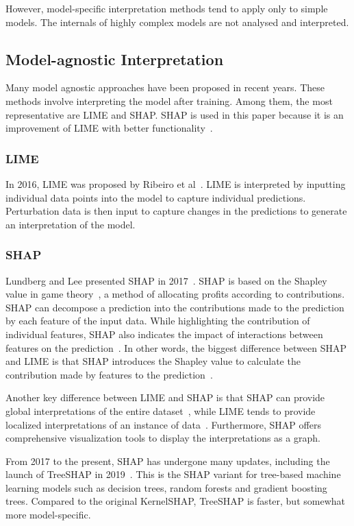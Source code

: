 \documentclass[runningheads,a4paper]{llncs}
\begin{document}
However, model-specific interpretation methods tend to apply only to simple models. The internals of highly complex models are not analysed and interpreted.

\subsection{Model-agnostic Interpretation}
Many model agnostic approaches have been proposed in recent years. 
These methods involve interpreting the model after training.
Among them, the most representative are LIME and SHAP.
SHAP is used in this paper because it is an improvement of LIME with better functionality~\cite{alvarezmelis2018robustness}.
\subsubsection{LIME}
In 2016, LIME was proposed by Ribeiro et al~\cite{ribeiro2016should}.
LIME is interpreted by inputting individual data points into the model to capture individual predictions. Perturbation data is then input to capture changes in the predictions to generate an interpretation of the model.
\subsubsection{SHAP}
Lundberg and Lee presented SHAP in 2017~\cite{lundberg2017unified}.
SHAP is based on the Shapley value in game theory~\cite{Shapley1953}, a method of allocating profits according to contributions.
SHAP can decompose a prediction into the contributions made to the prediction by each feature of the input data.
While highlighting the contribution of individual features, SHAP also indicates the impact of interactions between features on the prediction~\cite{lundberg2017unified}.
In other words, the biggest difference between SHAP and LIME is that SHAP introduces the Shapley value to calculate the contribution made by features to the prediction~\cite{lundberg2017unified}.

Another key difference between LIME and SHAP is that SHAP can provide global interpretations of the entire dataset~\cite{lundberg2017unified}, while LIME tends to provide localized interpretations of an instance of data~\cite{ribeiro2016should}. Furthermore, SHAP offers comprehensive visualization tools to display the interpretations as a graph.

From 2017 to the present, SHAP has undergone many updates, including the launch of TreeSHAP in 2019~\cite{lundberg2019consistent}.
This is the SHAP variant for tree-based machine learning models such as decision trees, random forests and gradient boosting trees. 
Compared to the original KernelSHAP, TreeSHAP is faster, but somewhat more model-specific.
\end{document}
